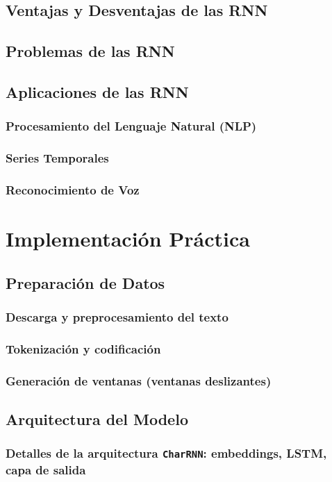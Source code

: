 \documentclass{article}
\begin{document}
\subsection{Ventajas y Desventajas de las RNN}
\subsection{Problemas de las RNN}
\subsection{Aplicaciones de las RNN}
\subsubsection{Procesamiento del Lenguaje Natural (NLP)}
\subsubsection{Series Temporales}
\subsubsection{Reconocimiento de Voz}

\newpage

\section{Implementación Práctica}
\subsection{Preparación de Datos}
\subsubsection{Descarga y preprocesamiento del texto}
\subsubsection{Tokenización y codificación}
\subsubsection{Generación de ventanas (ventanas deslizantes)}

\subsection{Arquitectura del Modelo}
\subsubsection{Detalles de la arquitectura \texttt{CharRNN}: embeddings, LSTM, capa de salida}
\end{document}
